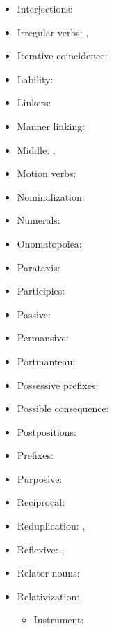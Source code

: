 \documentclass[oldfontcommands,oneside,a4paper,11pt]{article}
\begin{document}
\begin{itemize}
\item Interjections: \citet[283]{japhug14ideophones}
\item Irregular verbs: \citet[91]{jacques12agreement}, \citet[1215]{jacques12incorp}
\item Iterative coincidence: \citet[296]{jacques14linking}
\item Lability: \citet[216-9]{jacques12demotion}
\item Linkers:  \citet[276-7]{jacques14linking}
\item Manner linking:  \citet[320-5]{jacques14linking}
\item Middle:  \citet{jacques12demotion}, \citet{jacques15spontaneous}
\item Motion verbs: \citet[201-6]{jacques13harmonization}
\item Nominalization: \citet[5-7]{jacques14antipassive}
\item Numerals: \citet[4]{jacques14antipassive}
\item Onomatopoiea:   \citet[282]{japhug14ideophones}
\item Parataxis:  \citet[312;315]{jacques14linking}
\item Participles: \citet[5-6]{jacques14antipassive}
\item Passive: \citet[208-13]{jacques12demotion}
\item Permansive: \citet{jacques15spontaneous}
\item Portmanteau: \citet[136-7]{jacques10inverse}
\item Possessive prefixes: \citet[4]{jacques14antipassive}
\item Possible consequence:  \citet[308-311]{jacques14linking}
\item Postpositions:  \citet[272-4]{jacques14linking}
\item Prefixes: \citet[196-199]{jacques13harmonization}
\item Purposive:  \citet[306-8]{jacques14linking}
\item Reciprocal: \citet[212]{jacques12demotion}
\item Reduplication: \citet{jacques04these}, \citet{jacques07redupl}
\item Reflexive: \citet{jacques10refl}, \citet[85]{jacques12agreement}
\item Relator nouns:  \citet[274-6]{jacques14linking}
\item Relativization: \citet{jacques16sketch}
\begin{itemize}
\item Instrument: \citet{jacques15comparative}

\end{itemize}
\end{itemize}
\end{document}
